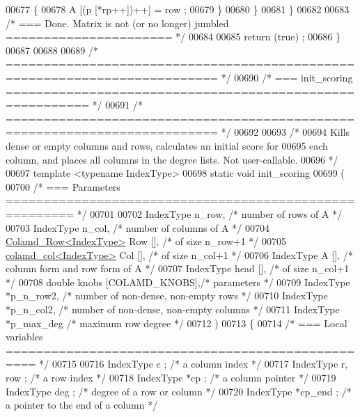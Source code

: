 \begin{DoxyCode}
{{{{{{{{{{00677       \{
00678     A [(p [*rp++])++] = row ;
00679       \}
00680     \}
00681   \}
00682 
00683   \textcolor{comment}{/* === Done.  Matrix is not (or no longer) jumbled ====================== */}
00684 
00685   \textcolor{keywordflow}{return} (\textcolor{keyword}{true}) ;
00686 \}
00687 
00688 
00689 \textcolor{comment}{/* ========================================================================== */}
00690 \textcolor{comment}{/* === init\_scoring ========================================================= */}
00691 \textcolor{comment}{/* ========================================================================== */}
00692 
00693 \textcolor{comment}{/*}
00694 \textcolor{comment}{  Kills dense or empty columns and rows, calculates an initial score for}
00695 \textcolor{comment}{  each column, and places all columns in the degree lists.  Not user-callable.}
00696 \textcolor{comment}{*/}
00697 \textcolor{keyword}{template} <\textcolor{keyword}{typename} IndexType>
00698 \textcolor{keyword}{static} \textcolor{keywordtype}{void} init\_scoring
00699   (
00700     \textcolor{comment}{/* === Parameters ======================================================= */}
00701 
00702     IndexType n\_row,      \textcolor{comment}{/* number of rows of A */}
00703     IndexType n\_col,      \textcolor{comment}{/* number of columns of A */}
00704     \hyperlink{structinternal_1_1_colamd___row}{Colamd\_Row<IndexType>} Row [],    \textcolor{comment}{/* of size n\_row+1 */}
00705     \hyperlink{structinternal_1_1colamd__col}{colamd\_col<IndexType>} Col [],    \textcolor{comment}{/* of size n\_col+1 */}
00706     IndexType A [],     \textcolor{comment}{/* column form and row form of A */}
00707     IndexType head [],    \textcolor{comment}{/* of size n\_col+1 */}
00708     \textcolor{keywordtype}{double} knobs [COLAMD\_KNOBS],\textcolor{comment}{/* parameters */}
00709     IndexType *p\_n\_row2,    \textcolor{comment}{/* number of non-dense, non-empty rows */}
00710     IndexType *p\_n\_col2,    \textcolor{comment}{/* number of non-dense, non-empty columns */}
00711     IndexType *p\_max\_deg    \textcolor{comment}{/* maximum row degree */}
00712     )
00713 \{
00714   \textcolor{comment}{/* === Local variables ================================================== */}
00715 
00716   IndexType c ;     \textcolor{comment}{/* a column index */}
00717   IndexType r, row ;    \textcolor{comment}{/* a row index */}
00718   IndexType *cp ;     \textcolor{comment}{/* a column pointer */}
00719   IndexType deg ;     \textcolor{comment}{/* degree of a row or column */}
00720   IndexType *cp\_end ;   \textcolor{comment}{/* a pointer to the end of a column */}
}}}}}}}}}}
\end{DoxyCode}
